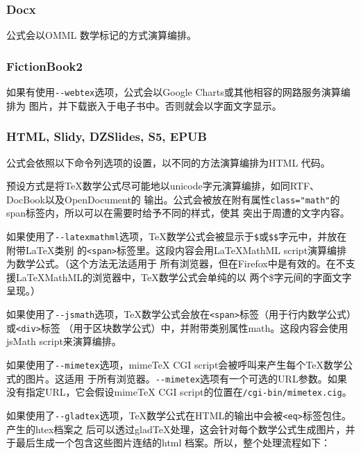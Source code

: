 \documentclass[cn]{elegantbook}
\newcommand{\passthrough}[1]{#1}
\begin{document}
\hypertarget{docx}{%
\subsubsection{Docx}\label{docx}}

公式会以OMML 数学标记的方式演算编排。

\hypertarget{fictionbook2}{%
\subsubsection{FictionBook2}\label{fictionbook2}}

如果有使用\passthrough{\lstinline!--webtex!}选项，公式会以Google
Charts或其他相容的网路服务演算编排为
图片，并下载嵌入于电子书中。否则就会以字面文字显示。

\hypertarget{html-slidy-dzslides-s5-epub}{%
\subsubsection{HTML, Slidy, DZSlides, S5,
EPUB}\label{html-slidy-dzslides-s5-epub}}

公式会依照以下命令列选项的设置，以不同的方法演算编排为HTML 代码。

预设方式是将TeX数学公式尽可能地以unicode字元演算编排，如同RTF、DocBook以及OpenDocument的
输出。公式会被放在附有属性\passthrough{\lstinline!class="math"!}的span标签内，所以可以在需要时给予不同的样式，使其
突出于周遭的文字内容。

如果使用了\passthrough{\lstinline!--latexmathml!}选项，TeX数学公式会被显示于\passthrough{\lstinline!$!}或\passthrough{\lstinline!$$!}字元中，并放在附带LaTeX类别
的\passthrough{\lstinline!<span>!}标签里。这段内容会用LaTeXMathML
script演算编排为数学公式。（这个方法无法适用于
所有浏览器，但在Firefox中是有效的。在不支援LaTeXMathML的浏览器中，TeX数学公式会单纯的以
两个\$字元间的字面文字呈现。）

如果使用了\passthrough{\lstinline!--jsmath!}选项，TeX数学公式会放在\passthrough{\lstinline!<span>!}标签（用于行内数学公式）或\passthrough{\lstinline!<div>!}标签
（用于区块数学公式）中，并附带类别属性math。这段内容会使用jsMath
script来演算编排。

如果使用了\passthrough{\lstinline!--mimetex!}选项，mimeTeX CGI
script会被呼叫来产生每个TeX数学公式的图片。这适用
于所有浏览器。\passthrough{\lstinline!--mimetex!}选项有一个可选的URL参数。如果没有指定URL，它会假设mimeTeX
CGI script的位置在\passthrough{\lstinline!/cgi-bin/mimetex.cig!}。

如果使用了\passthrough{\lstinline!--gladtex!}选项，TeX数学公式在HTML的输出中会被\passthrough{\lstinline!<eq>!}标签包住。产生的htex档案之
后可以透过gladTeX处理，这会针对每个数学公式生成图片，并于最后生成一个包含这些图片连结的html
档案。所以，整个处理流程如下：
\end{document}
